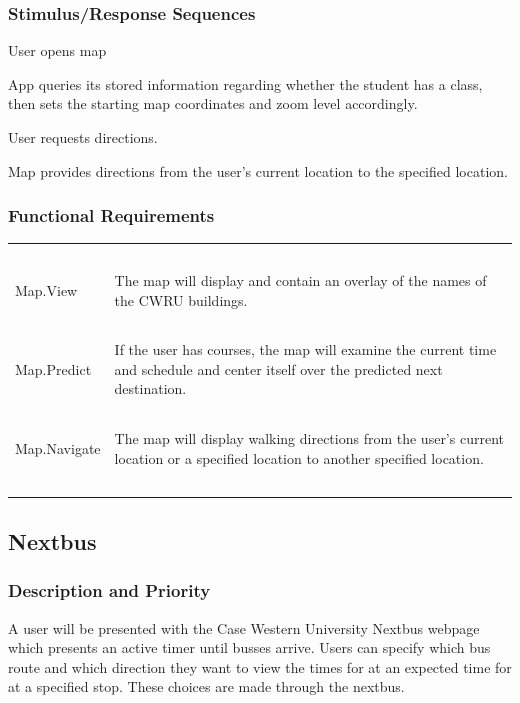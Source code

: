 \documentclass[pdftex,12pt,letter]{article}
\begin{document}
\subsubsection{Stimulus/Response Sequences}
\begin{description}\itemsep1pt
\item[Stimulus:] User opens map
\item[Response:] App queries its stored information regarding whether the student has a class, then sets the starting map coordinates and zoom level accordingly.\\
\item[Stimulus:] User requests directions.\\
\item[Response:] Map provides directions from the user's current location to the specified location.\\
\end{description}
\subsubsection{Functional Requirements}
\begin{table}[!h]
\begin{tabularx}{\textwidth }[t]{|l Y|}
\hline
~&~\\
Map.View & The map will display and contain an overlay of the names of the CWRU buildings. \\ 
~&~\\
Map.Predict & If the user has courses, the map will examine the current time and schedule and center itself over the predicted next destination. \\
~&~\\
Map.Navigate & The map will display walking directions from the user's current location or a specified location to another specified location. \\
~&~\\
\hline
\end{tabularx}
\end{table}
\subsection{Nextbus}
\subsubsection{Description and Priority}
A user will be presented with the Case Western University Nextbus webpage which presents an active timer until busses arrive. Users can specify which bus route and which direction they want to view the times for at an expected time for at a specified stop. These choices are made through the nextbus.
\end{document}
